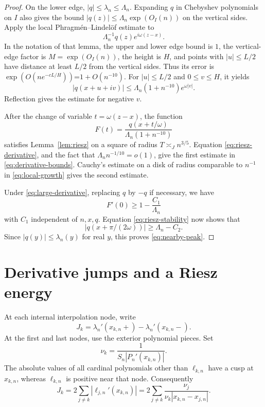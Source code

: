 \documentclass[11pt]{article}
\numberwithin{equation}{section}
\begin{document}
\begin{proof}
On the lower edge, \(|q|\le\lambda_n\le\Lambda_n\). Expanding \(q\) in
Chebyshev polynomials on \(I\) also gives the bound
\(|q(z)|\le\Lambda_n\exp(O_I(n))\) on the vertical sides. Apply the local
Phragm\'en--Lindel\"of estimate \cite[Lemma 2.5]{Tao} to
\[
 \Lambda_n^{-1}q(z)e^{i\omega(z-x)}.
\]
In the notation of that lemma, the upper and lower edge bound is \(1\),
the vertical-edge factor is \(M=\exp(O_I(n))\), the height is \(H\),
and points with \(|u|\le L/2\) have distance at least \(L/2\) from the
vertical sides. Thus its error is
\(\exp(O(n e^{-cL/H}))\)=\(1+O(n^{-10})\). For \(|u|\le L/2\) and
\(0\le v\le H\), it yields
\begin{equation}\label{eq:local-growth}
 |q(x+u+iv)|\le\Lambda_n(1+n^{-10})e^{\omega|v|}.
\end{equation}
Reflection gives the estimate for negative \(v\).

After the change of variable \(t=\omega(z-x)\), the function
\[
 F(t)=\frac{q(x+t/\omega)}{\Lambda_n(1+n^{-10})}
\]
satisfies Lemma~\ref{lem:riesz} on a square of radius \(T\asymp_J n^{3/5}\).
Equation \eqref{eq:riesz-derivative}, and the fact that \(\Lambda_n
n^{-1/10}=o(1)\), give the first estimate in \eqref{eq:derivative-bounds}.
Cauchy's estimate on a disk of radius comparable to \(n^{-1}\) in
\eqref{eq:local-growth} gives the second estimate.

Under \eqref{eq:large-derivative}, replacing \(q\) by \(-q\) if necessary, we have
\[
 F'(0)\ge1-\frac{C_1}{\Lambda_n}
\]
with \(C_1\) independent of \(n,x,q\). Equation \eqref{eq:riesz-stability} now
shows that
\[
 |q(x+\pi/(2\omega))|\ge\Lambda_n-C_2.
\]
Since \(|q(y)|\le\lambda_n(y)\) for real \(y\), this proves
\eqref{eq:nearby-peak}.
\end{proof}

\section{Derivative jumps and a Riesz energy}\label{sec:energy}

At each internal interpolation node, write
\[
 J_k=\lambda_n'(x_{k,n}+)-\lambda_n'(x_{k,n}-).
\]
At the first and last nodes, use the exterior polynomial pieces. Set
\[
 \nu_k=\frac1{S_n|P_n'(x_{k,n})|}.
\]
The absolute values of all cardinal polynomials other than \(\ell_{k,n}\) have
a cusp at \(x_{k,n}\), whereas \(\ell_{k,n}\) is positive near that node.
Consequently
\begin{equation}\label{eq:jump}
 J_k=2\sum_{j\ne k}|\ell_{j,n}'(x_{k,n})|
     =2\sum_{j\ne k}\frac{\nu_j}{\nu_k|x_{k,n}-x_{j,n}|}.
\end{equation}
\end{document}
